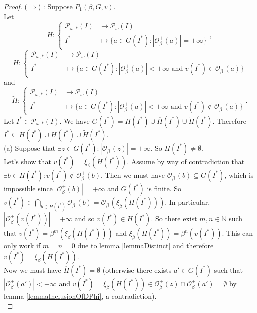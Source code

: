 \documentclass[a4paper,11pt]{article}
\theoremstyle{plain}
\theoremstyle{definition}
\theoremstyle{remark}
\begin{document}
\begin{proof}
($\Rightarrow$) : Suppose $P_1(\beta,G,v)$. \\
Let
\[ H : \begin{cases} \mathcal{P}_{\omega,*}(I) &\to \mathcal{P}_{\omega}(I) \\ I^* &\mapsto \{a \in G(I^*) : |\mathcal{O}^{+}_\beta(a)| = +\infty \} \end{cases}, \]
\[ \overline{H} : \begin{cases} \mathcal{P}_{\omega,*}(I) &\to \mathcal{P}_{\omega}(I) \\ I^* &\mapsto \{a \in G(I^*) : |\mathcal{O}^{+}_\beta(a)| < +\infty \text{ and } v(I^*) \in \mathcal{O}^{+}_\beta(a) \} \end{cases} \]
and
\[ \widetilde{H} : \begin{cases} \mathcal{P}_{\omega,*}(I) &\to \mathcal{P}_{\omega}(I) \\ I^* &\mapsto \{a \in G(I^*) : |\mathcal{O}^{+}_\beta(a)| < +\infty \text{ and } v(I^*) \notin \mathcal{O}^{+}_\beta(a) \} \end{cases}. \]
Let $I^* \in \mathcal{P}_{\omega,*}(I)$.
We have $G(I^*) = H(I^*) \cup \overline{H}(I^*) \cup \widetilde{H}(I^*)$. Therefore $I^* \subseteq H(I^*) \cup \overline{H}(I^*) \cup \widetilde{H}(I^*)$. \\
(a) Suppose that $\exists z \in G(I^*) : |\mathcal{O}^{+}_\beta(z)| = +\infty$. So $H(I^*) \neq \emptyset$. \\
Let's show that $v(I^*) = \xi_\beta(H(I^*))$. Assume by way of contradiction that $\exists b \in H(I^*) : v(I^*) \notin \mathcal{O}^{+}_\beta(b)$. Then we must have $\mathcal{O}^{+}_\beta(b) \subseteq G(I^*)$, which is impossible since $|\mathcal{O}^{+}_\beta(b)|=+\infty$ and $G(I^*)$ is finite. So $v(I^*) \in \bigcap_{b \in H(I^*)} \mathcal{O}^{+}_\beta(b) = \mathcal{O}^{+}_\beta(\xi_\beta(H(I^*)))$. In particular, $|\mathcal{O}^{+}_\beta(v(I^*))|=+\infty$ and so $v(I^*) \in H(I^*)$. So there exist $m,n \in \mathbb{N}$ such that $v(I^*) = \beta^m(\xi_\beta(H(I^*)))$ and $\xi_\beta(H(I^*)) = \beta^n(v(I^*))$. This can only work if $m=n=0$ due to lemma \ref{lemmaDistinct} and therefore $v(I^*) = \xi_\beta(H(I^*))$. \\
Now we must have $\overline{H}(I^*) = \emptyset$ (otherwise there exists $a' \in G(I^*)$ such that $|\mathcal{O}^{+}_\beta(a')| < +\infty$ and $v(I^*) = \xi_\beta(H(I^*)) \in \mathcal{O}^{+}_\beta(z) \cap \mathcal{O}^{+}_\beta(a') = \emptyset$ by lemma \ref{lemmaInclusionOfDPhi}, a contradiction). \\

\end{proof}
\end{document}
